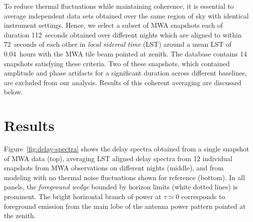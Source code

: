 \documentclass[preprint2,apjl,numberedappendix,twocolappendix,appendixfloats]{emulateapj}
\begin{document}
To reduce thermal fluctuations while maintaining coherence, it is essential to average independent data sets obtained over the same region of sky with identical instrument settings. Hence, we select a subset of MWA snapshots each of duration 112~seconds obtained over different nights which are aligned to within 72~seconds of each other in {\it local sidereal time} (LST) around a mean LST of 0.04~hours with the MWA tile beam pointed at zenith. The database contains 14 snapshots satisfying these criteria. Two of these snapshots, which contained amplitude and phase artifacts for a significant duration across different baselines, are excluded from our analysis. Results of this coherent averaging are discussed below.

\section{Results}\label{sec:results}

Figure~\ref{fig:delay-spectra} shows the delay spectra obtained from a single snapshot of MWA data (top), averaging LST aligned delay spectra from 12 individual snapshots from MWA observations on different nights (middle), and from modeling with no thermal noise fluctuations shown for reference (bottom). In all panels, the {\it foreground wedge} bounded by horizon limits (white dotted lines) is prominent. The bright horizontal branch of power at $\tau\simeq 0$ corresponds to foreground emission from the main lobe of the antenna power pattern pointed at the zenith. 
\end{document}
